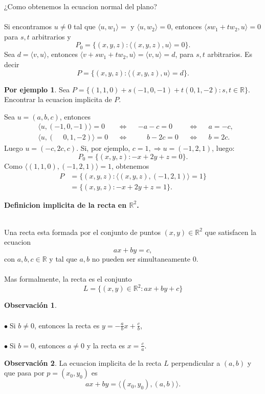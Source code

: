\documentclass{article}
\theoremstyle{definition}
\theoremstyle{definition}
\newtheorem*{obs}{Observación}
\newtheorem*{ej}{Por ejemplo}
\theoremstyle{remark}
\newcommand\bl{$\bullet\;$}
\begin{document}
¿Como obtenemos la ecuacion normal del plano? \\\\
Si encontramos $u \neq 0$ tal que $\langle u , w_1 \rangle =$ y $\langle u, w_2 \rangle = 0 $, entonces $\langle sw_1 + tw_2, u \rangle = 0$ para $s,t$ arbitrarios y \[
  P_0 = \big\{(x,y,z) : \big\langle(x,y,z),u \big\rangle = 0\big\}.
\]
Sea $d=\langle v,u \rangle$, entonces $\langle v+sw_1+tw_2,u \rangle = \langle v,u \rangle = d$, para $s,t$ arbitrarios. Es decir \[
  P=\big\{(x,y,z) : \big\langle(x,y,z),u \big\rangle=d\big\}.
\]
\begin{ej}
  Sea $P=\big\{(1,1,0)+s(-1,0,-1)+t(0,1,-2) : s,t \in \mathbb{R}\big\}.$ Encontrar la ecuacion implicita de $P$.
\end{ej}
Sea $u=(a,b,c)$, entonces \[
  \begin{aligned}
&\langle u,(-1,0,-1)\rangle = 0 && \Leftrightarrow &&-a-c=0 && \Leftrightarrow && a=-c, \\
&\langle u,(\phantom{-}0,1,-2)\rangle = 0 && \Leftrightarrow && \phantom{-}b-2c=0 && \Leftrightarrow && b=2c.
  \end{aligned}
\]
Luego $u=(-c,2c,c)$. Si, por ejemplo, $c=1, \Rightarrow u=(-1,2,1)$, luego: \[
  P_0=\big\{(x,y,z) : -x+2y + z =0\big\}.
\]
Como $\big\langle (1,1,0),(-1,2,1)\big\rangle=1$, obtenemos \[
  \begin{aligned}
    P&=\big\{(x,y,z) : \big\langle (x,y,z),(-1,2,1)\big\rangle=1\big\}\\
     &=\big\{(x,y,z):-x+2y+z=1\big\}.
  \end{aligned}
\]
\pagebreak 

\begin{center}
  \textbf{Definicion implicita de la recta en $\mathbb{R}^2$.}
\end{center}
\begin{defi}\;\\
  Una recta esta formada por el conjunto de puntos $(x,y) \in \mathbb{R}^2$ que satisfacen la ecuacion \[
ax+by=c,
  \]
  con $a,b,c \in \mathbb{R}$ y tal que $a,b$ no pueden ser simultaneamente $0$.
\\\\
Mas formalmente, la recta es el conjunto \[
  L=\big\{(x,y)\in \mathbb{R}^2 : ax+by + c\big\}
\]
\end{defi}
\begin{obs}
  \; \\\\
  \bl Si $b \neq 0$, entonces la recta es $y=-\frac{a}{b}x+\frac{c}{b}$,\\\\
  \bl Si $b=0$, entonces $a \neq 0$ y la recta es $x=\frac{c}{a}$.
\end{obs}
\begin{obs}
  La ecuacion implicita de la recta $L$ perpendicular a $(a,b)$ y que pasa por $p=(x_0,y_0)$ es \[
ax+by=\big\langle (x_0,y_0),(a,b)\big\rangle.
  \]
\end{obs}
\begin{figure}[h]
\centering
\def\svgwidth{0.75\textwidth}

\end{figure}
\pagebreak
\end{document}
